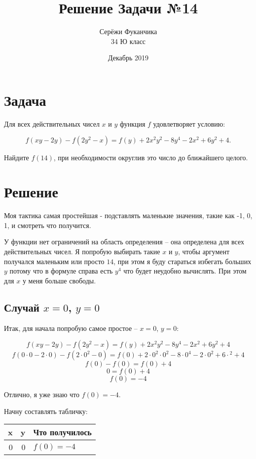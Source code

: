 \documentclass{article}
\title{Решение Задачи №14}
\author{Серёжи Фуканчика\\34 Ю класс}
\date{Декабрь 2019}
\begin{document}
\maketitle

\section{Задача}
Для всех действительных чисел $x$ и $y$ функция $f$ удовлетворяет условию:

$$f(xy-2y)-f(2y^2-x)=f(y)+2x^2y^2-8y^4-2x^2+6y^2+4.$$

Найдите $f(14)$, при необходимости округлив это число до ближайшего целого.

\section{Решение}
Моя тактика самая простейшая - подставлять маленькие значения, такие как -1, 0, 1, и смотреть что получится.

У функции нет ограничений на область определения -- она определена для всех действительных чисел. Я попробую выбирать такие $x$ и $y$, чтобы аргумент получался маленьким или просто $14$, при этом я буду стараться избегать больших $y$ потому что в формуле справа есть $y^4$ что будет неудобно вычислять. При этом для $x$ у меня больше свободы.

\subsection{Случай $x=0$, $y=0$}
Итак, для начала попробую самое простое -- {\boldmath $x=0$, $y=0$}:

$$f(xy-2y)-f(2y^2-x)=f(y)+2x^2y^2-8y^4-2x^2+6y^2+4$$
$$f(0\cdot{}0-2\cdot{}0)-f(2\cdot{}0^2-0)=f(0)+2\cdot{}0^2\cdot{}0^2-8\cdot{}0^4-2\cdot{}0^2+6\cdot{}^2+4$$
$$f(0)-f(0)=f(0)+4$$
$$0=f(0)+4$$
$$f(0)=-4$$

Отлично, я уже знаю что {\boldmath\color{red} $f(0)=-4$}.

\begin{samepage}
Начну составлять табличку:
\begin{center}
 \begin{tabular}{r r l} 
 \hline
 x & y & Что получилось \\
 \hline
 0 & 0 & $f(0)=-4$      \\
 \hline
 \end{tabular}
\end{center}
\end{samepage}
\end{document}
